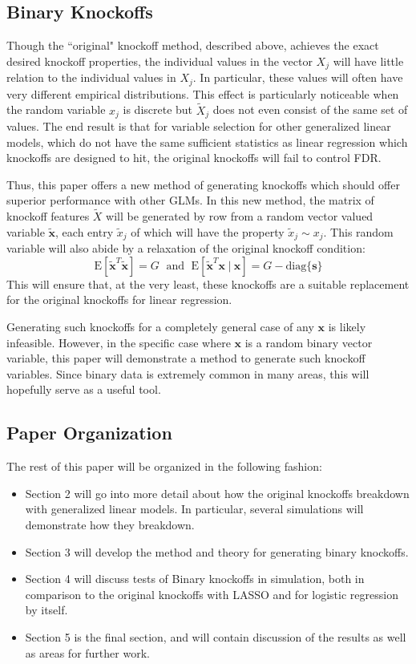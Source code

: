 \documentclass[11pt]{article}
\newcommand{\E}{\mathrm{E}}
\newcommand{\diag}[1]{\mathrm{diag}\{#1\}}
\newcommand{\st}{ \; \big | \:}
\theoremstyle{definition}
\begin{document}
\subsection{Binary Knockoffs}
    Though the ``original" knockoff method, described above, achieves the exact desired knockoff properties, the individual values in the vector $X_j$ will have little relation to the individual values in $X_j$. In particular, these values will often have very different empirical distributions. This effect is particularly noticeable when the random variable $x_j$ is discrete but $\tilde X_j$ does not even consist of the same set of values. The end result is that for variable selection for other generalized linear models, which do not have the same sufficient statistics as linear regression which knockoffs are designed to hit, the original knockoffs will fail to control FDR. \par
    Thus, this paper offers a new method of generating knockoffs which should offer superior performance with other GLMs. In this new method, the matrix of knockoff features $\tilde X$ will be generated by row from a random vector valued variable $\mathbf{\tilde x}$, each entry $\tilde x_j$ of which will have the property $\tilde x_j \sim x_j$. This random variable will also abide by a relaxation of the original knockoff condition:
    \[ \E[\mathbf{\tilde x}^T\mathbf{\tilde x}]=G \; \textrm{ and } \; \E[\mathbf{\tilde x}^T \mathbf x \st \mathbf x] = G - \diag{\mathbf s}\]
    This will ensure that, at the very least, these knockoffs are a suitable replacement for the original knockoffs for linear regression. \par
    Generating such knockoffs for a completely general case of any $\mathbf x$ is likely infeasible. However, in the specific case where $\mathbf x$ is a random binary vector variable, this paper will demonstrate a method to generate such knockoff variables. Since binary data is extremely common in many areas, this will hopefully serve as a useful tool.

\subsection{Paper Organization}
The rest of this paper will be organized in the following fashion:
\begin{itemize}
    \item Section 2 will go into more detail about how the original knockoffs breakdown with generalized linear models. In particular, several simulations will demonstrate how they breakdown.
    \item Section 3 will develop the method and theory for generating binary knockoffs.
    \item Section 4 will discuss tests of Binary knockoffs in simulation, both in comparison to the original knockoffs with LASSO and for logistic regression by itself.
    \item Section 5 is the final section, and will contain discussion of the results as well as areas for further work.
\end{itemize}
\end{document}

